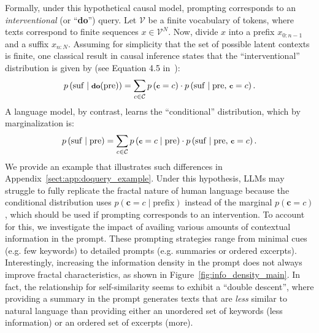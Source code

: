 Formally, under this hypothetical causal model, prompting corresponds to an \emph{interventional} (or ``\textbf{do}'') query. Let $\mathcal{V}$ be a finite vocabulary of tokens, where texts correspond to finite sequences $x\in\mathcal{V}^N$. Now, divide $x$ into a prefix $x_{0:n-1}$ and a suffix $x_{n:N}$. Assuming for simplicity that the set of possible latent contexts is finite, one classical result in causal inference states that the ``interventional'' distribution is given by (see Equation 4.5 in~\cite{neal2020introduction}): 
\begin{equation}\label{eq:do_query}
\footnotesize
    p\left(\mathrm{suf}\;|\;\textbf{do}(\mathrm{pre})\right) = \sum_{c\in\mathcal{C}} p\left(\textbf{c}=c\right)\cdot p\left(\mathrm{suf}\;|\;\mathrm{pre}, \,\textbf{c}=c\right).
\end{equation}
A language model, by contrast, learns the ``conditional'' distribution, which by marginalization is:
\begin{equation}\label{eq:cond}
\footnotesize
    p\left(\mathrm{suf}\;|\;\mathrm{pre}\right) = \sum_{c\in\mathcal{C}} p\left(\textbf{c}=c\;|\;\mathrm{pre}\right)\cdot p\left(\mathrm{suf}\;|\;\mathrm{pre}, \,\textbf{c}=c\right).
\end{equation}
We provide an example that illustrates such differences in Appendix~\ref{sect:app:doquery_example}. Under this hypothesis, LLMs may struggle to fully replicate the fractal nature of human language because the conditional distribution uses $p\left(\textbf{c}=c\;|\;\mathrm{prefix}\right)$ instead of the marginal $p\left(\textbf{c}=c\right)$, which should be used if prompting corresponds to an intervention. To account for this, we investigate the impact of availing various amounts of contextual information in the prompt. These prompting strategies range from minimal cues (e.g. few keywords) to detailed prompts (e.g. summaries or ordered  excerpts). Interestingly, increasing the information density in the prompt does not always improve fractal characteristics, as shown in Figure~\ref{fig:info_density_main}. In fact, the relationship for self-similarity seems to exhibit a ``double descent'', where providing a summary in the prompt generates texts that are \emph{less} similar to natural language than providing either an unordered set of keywords (less information) or an ordered set of excerpts (more).


